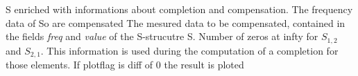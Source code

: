 %
%
%
%
%
%
%
%
\label{Comp}
{\fitem[So] S enriched with informations about completion and
compensation. The frequency data of So are compensated}
{%
\fitem[S] The mesured data to be compensated, contained in the fields
{\it freq} and {\it value} of the S-strucutre S.
\fitem[zeros=DVC.CDAFS.zeros\_at\_inf] Number of zeros at infty for
$S_{1,2}$ and $S_{2,1}$. This information is used during the computation of 
a completion for those elements.
\fitem[plotflag=DVC.CDAFS.plot\_flag] If plotflag is diff of 0 the
result is ploted}
